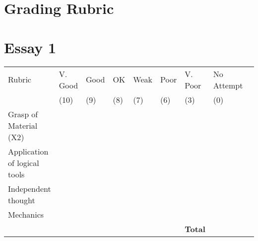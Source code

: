 \documentclass[11pt,article,oneside]{memoir}
\begin{document}
\newpage
\section{Grading Rubric}

\section*{Essay 1}
\begin{center}


\resizebox{14cm}{!} {
    \begin{tabular}{ | l | l | l | l | l | l | l | l | l |    }
    \hline
    Rubric &  V. Good & Good & OK & Weak & Poor & V. Poor & No Attempt \\  
	 & (10) & (9) & (8) & (7) & (6) & (3)  & (0) \\    \hline
    Grasp of Material (X2) & & & & & & &\\ \hline   
    Application of logical tools &  & & & & & &\\ \hline
	Independent thought &  & & & & & &\\ \hline
 Mechanics & & & & & &  &\\ \hline \hline
 & &  & & &  & \textbf{Total}  & \\ \hline
    \end{tabular}
}


\end{center}




\end{document}

